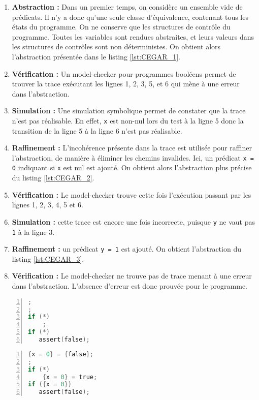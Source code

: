 \begin{enumerate}
\def\labelenumi{\arabic{enumi})}
\item
  \textbf{Abstraction :} Dans un premier temps, on considère un ensemble vide de
  prédicats. Il n'y a donc qu'une seule classe d'équivalence, contenant tous les
  états du programme. On ne conserve que les structures de contrôle du
  programme. Toutes les variables sont rendues abstraites, et leurs valeurs dans
  les structures de contrôles sont non déterministes. On obtient alors
  l'abstraction présentée dans le listing \ref{lst:CEGAR_1}.
\item
  \textbf{Vérification :} Un model-checker pour programmes booléens permet de
  trouver la trace exécutant les lignes 1, 2, 3, 5, et 6 qui mène à une erreur
  dans l'abstraction.
\item
  \textbf{Simulation :} Une simulation symbolique permet de constater que la
  trace n'est pas réalisable. En effet, \texttt{x} est non-nul lors
  du test à la ligne 5 donc la transition de la ligne 5 à la ligne 6 n'est pas
  réalisable.
\item
  \textbf{Raffinement :} L'incohérence présente dans la trace est utilisée pour
  raffiner l'abstraction, de manière à éliminer les chemins invalides. Ici, un
  prédicat \texttt{{x = 0}} indiquant si \texttt{x} est nul est ajouté. On
  obtient alors l'abstraction plus précise du listing \ref{lst:CEGAR_2}.
\item
  \textbf{Vérification :} Le model-checker trouve cette fois l'exécution
  passant par les lignes 1, 2, 3, 4, 5 et 6.
\item
  \textbf{Simulation :} cette trace est encore une fois incorrecte, puisque
  \texttt{y} ne vaut pas \texttt{1} à la ligne 3.
\item
  \textbf{Raffinement :} un prédicat \texttt{{y = 1}} est ajouté. On obtient
  l'abstraction du listing \ref{lst:CEGAR_3}.
\item
  \textbf{Vérification :} Le model-checker ne trouve pas de trace menant à une
  erreur dans l'abstraction. L'absence d'erreur est donc prouvée pour le
  programme.
\end{enumerate}

\noindent\begin{minipage}{.45\textwidth}
  \begin{lstlisting}[language=C, label=lst:CEGAR_1, numbers=left, frame=single,
    caption=Abstraction initiale]
;
;
if (*)
    ;
if (*)
   assert(false);
\end{lstlisting}
\end{minipage}\hfill
\begin{minipage}{.45\textwidth}
  \begin{lstlisting}[language=C, label=lst:CEGAR_2, numbers=left, frame=single,
    caption=Premier raffinement]
{x = 0} = {false};
;
if (*)
    {x = 0} = true;
if ({x = 0})
   assert(false);
\end{lstlisting}
\end{minipage}


